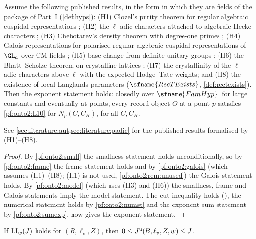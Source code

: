 \begin{theorem}\label{pf:onto2:thmB}
Assume the following published results, in the form in which they are fields of the package of Part~I (\cref{def:hyps}): (H1)
Clozel's purity theorem for regular algebraic cuspidal representations \cite{Clozel1990}; (H2) the $\ell$-adic characters attached to
algebraic Hecke characters \cite{Serre1968}; (H3) Chebotarev's density theorem with degree-one primes \cite{Chebotarev1926}; (H4)
Galois representations for polarised regular algebraic cuspidal representations of $\GL_a$ over CM fields
\cite{ClozelHarrisLabesse2011,Shin2011,ChenevierHarris2013,Caraiani2012,BarnetLambEtAl2014b}; (H5) base change from definite unitary groups
\cite{Labesse2011}; (H6) the Bhatt--Scholze theorem on crystalline lattices \cite{BhattScholze2023}; (H7) the crystallinity of the
$\ell$-adic characters above $\ell$ with the expected Hodge--Tate weights; and (H8) the existence of local Langlands parameters
($\sfname{RecTExists}$, \cref{def:rectexists}). Then the exponent statement holds: closedly over $\sfname{FamHyp}$, for large constants
and eventually at points, every record object $O$ at a point $p$ satisfies \ref{pf:onto2:L10} for $N_p(C,C_H)$, for all $C,C_H$.
\end{theorem}

See \cref{sec:literature:aut,sec:literature:padic} for the published results formalised by (H1)--(H8).

\begin{proof}
By \cref{pf:onto2:small} the smallness statement holds unconditionally, so by \cref{pf:onto2:frame} the frame statement holds and by
\cref{pf:onto2:galois} (which assumes (H1)--(H8); (H1) is not used, \cref{pf:onto2:rem:unused}) the Galois statement holds. By \cref{pf:onto2:model} (which uses (H3) and (H6)) the
smallness, frame and Galois statements imply the model statement. The cut inequality holds
(), the numerical
statement holds by \cref{pf:onto2:numst} and the exponent-sum statement by \cref{pf:onto2:sumexp}.  now gives the
exponent statement.
\end{proof}

\begin{lemma}\label{pf:onto2:jexpU}
If $\mathrm{LI}_w(J)$ holds for $(B,\ell_v,Z)$, then $0\le J^{\mathrm{u}}(B,\ell_v,Z,w)\le J$.
\end{lemma}

